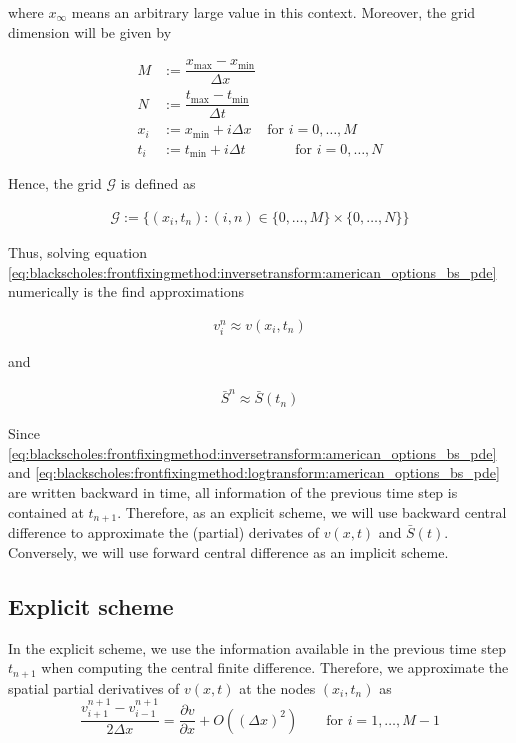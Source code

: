 where $x_{\infty}$ means an arbitrary large value in this context. Moreover, the grid
dimension will be given by

\begin{align}
  M &:= \dfrac{x_{\text{max}} - x_{\text{min}}}{\Delta x} \\ 
  N &:= \dfrac{t_{\text{max}} - t_{\text{min}}}{\Delta t} \\ 
  x_i &:= x_{\text{min}} + i\Delta x & \text{for $i = 0,\dots, M$} \\
  t_i &:= t_{\text{min}} + i{\Delta t} & \qquad \text{for $i = 0,\dots, N$}
\end{align}

Hence, the grid $\mathcal{G}$ is defined as

\begin{align}
  \mathcal{G} := \{(x_i, t_n): (i, n) \in \{0,\dots,M\}\times\{0,\dots,N\}\}
\end{align}

Thus, solving equation \eqref{eq:blackscholes:frontfixingmethod:inversetransform:american_options_bs_pde}
numerically is the find approximations 

\begin{align*}
  v^{n}_i \approx v(x_i,t_n)
\end{align*}

and

\begin{align*}
  \bar{S}^{n} \approx \bar{S}(t_n)
\end{align*}

Since \eqref{eq:blackscholes:frontfixingmethod:inversetransform:american_options_bs_pde}
and \eqref{eq:blackscholes:frontfixingmethod:logtransform:american_options_bs_pde}
are written backward in time, all information of the previous time step is contained
at $t_{n+1}$. Therefore, as an explicit scheme, we will use backward central difference 
to approximate the (partial) derivates of $v(x, t)$ and $\bar{S}(t)$. Conversely,
we will use forward central difference as an implicit scheme. 

\subsection{Explicit scheme}

In the explicit scheme, we use the information available in the previous time 
step $t_{n+1}$ when computing the central finite difference. 
Therefore, we approximate the spatial partial derivatives of $v(x,t)$ at the nodes
$(x_{i},t_{n})$ as
\begin{equation}
  \dfrac{v^{n+1}_{i+1} - v^{n+1}_{i-1}}{2 \Delta{x}} = \dfrac{\partial{v}}{\partial{x}}+ O((\Delta{x})^2) \qquad \text{for $i = 1, \dots, M - 1$}
\end{equation}

